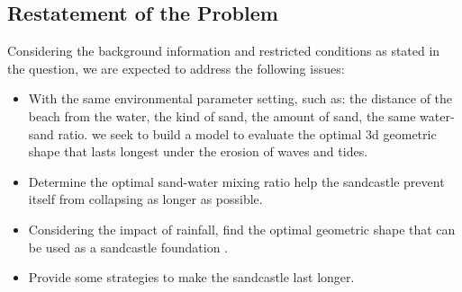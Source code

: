 \documentclass{mcmthesis}		    %
\begin{document}
	\subsection{Restatement of the Problem}
	Considering the background information and restricted conditions as stated in the question, we are expected to address the following issues:
	\setlength{\parskip}{0.1\baselineskip}
	\begin{itemize}
% 	
	   \item With the same environmental parameter setting, such as: the distance of the beach from the water, the kind of sand, the amount of sand, the same water-sand ratio. we seek to build a model to evaluate the optimal 3d geometric shape that lasts longest under the erosion of waves and tides.
	   \item Determine the optimal sand-water mixing ratio help the sandcastle prevent itself from collapsing as longer as possible.
	   \item Considering the impact of rainfall, find the optimal geometric shape that can be used as a sandcastle foundation .
	   \item Provide some strategies to make the sandcastle last longer. 
	\end{itemize}
	\setlength{\parskip}{0.5\baselineskip}
\end{document}
